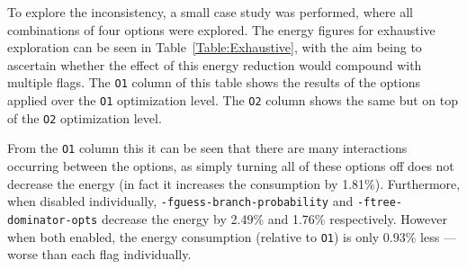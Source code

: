 \documentclass[twocolumn]{article}
\begin{document}
To explore the inconsistency, a small case study was performed, where all combinations of four options were explored. The energy figures for exhaustive exploration can be seen in Table~\ref{Table:Exhaustive}, with the aim being to ascertain whether the effect of this energy reduction would compound with multiple flags. The \texttt{O1} column of this table shows the results of the options applied over the \texttt{O1} optimization level. The \texttt{O2} column shows the same but on top of the \texttt{O2} optimization level.

From the \texttt{O1} column this it can be seen that there are many interactions occurring between the options, as simply turning all of these options off does not decrease the energy (in fact it increases the consumption by 1.81\%). Furthermore, when disabled individually, \texttt{-fguess-branch-probability} and \texttt{-ftree-dominator-opts} decrease the energy by 2.49\% and 1.76\% respectively. However when both enabled, the energy consumption (relative to \texttt{O1}) is only 0.93\% less --- worse than each flag individually.
\end{document}
